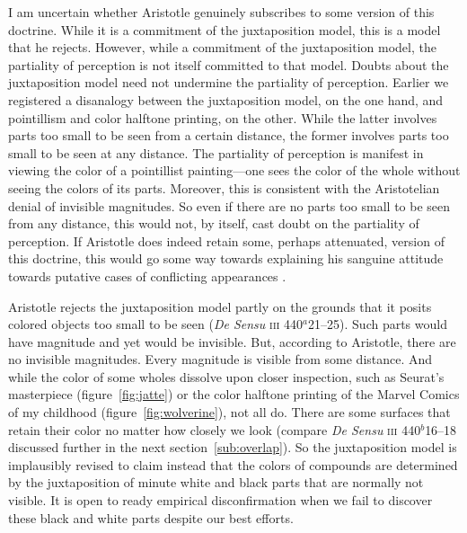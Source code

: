 I am uncertain whether Aristotle genuinely subscribes to some version of this doctrine. While it is a commitment of the juxtaposition model, this is a model that he rejects. However, while a commitment of the juxtaposition model, the partiality of perception is not itself committed to that model. Doubts about the juxtaposition model need not undermine the partiality of perception. Earlier we registered a disanalogy between the juxtaposition model, on the one hand, and pointillism and color halftone printing, on the other. While the latter involves parts too small to be seen from a certain distance, the former involves parts too small to be seen at any distance. The partiality of perception is manifest in viewing the color of a pointillist painting---one sees the color of the whole without seeing the colors of its parts. Moreover, this is consistent with the Aristotelian denial of invisible magnitudes. So even if there are no parts too small to be seen from any distance, this would not, by itself, cast doubt on the partiality of perception. If Aristotle does indeed retain some, perhaps attenuated, version of this doctrine, this would go some way towards explaining his sanguine attitude towards putative cases of conflicting appearances \citep[on how the partiality of perception can help dissipate some appearances of conflict see][]{Kalderon:2006tg}.

Aristotle rejects the juxtaposition model partly on the grounds that it posits colored objects too small to be seen (\emph{De Sensu} \textsc{iii} 440\( ^{a} \)21--25). Such parts would have magnitude and yet would be invisible. But, according to Aristotle, there are no invisible magnitudes. Every magnitude is visible from some distance. And while the color of some wholes dissolve upon closer inspection, such as Seurat's masterpiece (figure~\ref{fig:jatte}) or the color halftone printing of the Marvel Comics of my childhood (figure~\ref{fig:wolverine}), not all do. There are some surfaces that retain their color no matter how closely we look (compare \emph{De Sensu} \textsc{iii} 440\( ^{b} \)16--18 discussed further in the next section~\ref{sub:overlap}). So the juxtaposition model is implausibly revised to claim instead that the colors of compounds are determined by the juxtaposition of minute white and black parts that are normally not visible. It is open to ready empirical disconfirmation when we fail to discover these black and white parts despite our best efforts.

